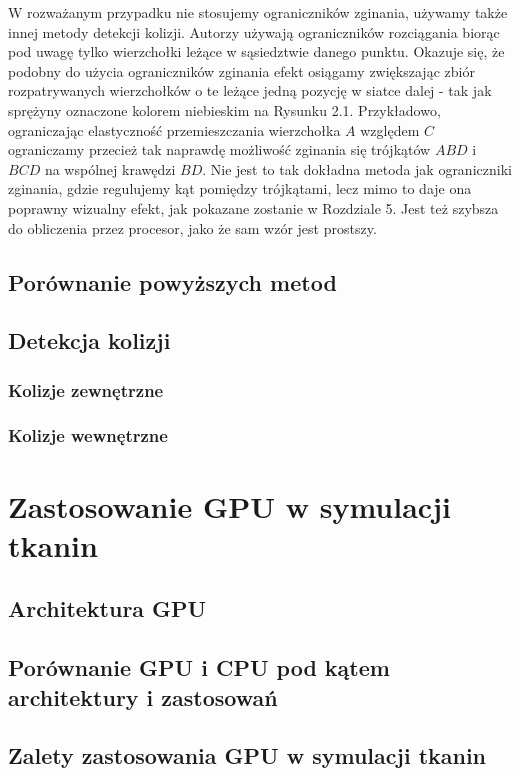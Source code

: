 			W rozważanym przypadku nie stosujemy ograniczników zginania, używamy także innej metody detekcji kolizji. Autorzy \cite{posbased} używają ograniczników rozciągania biorąc pod uwagę tylko wierzchołki leżące w sąsiedztwie danego punktu. Okazuje się, że podobny do użycia ograniczników zginania efekt osiągamy zwiększając zbiór rozpatrywanych wierzchołków o te leżące jedną pozycję w siatce dalej - tak jak sprężyny oznaczone kolorem niebieskim na Rysunku 2.1. Przykładowo, ograniczając elastyczność przemieszczania wierzchołka \(A\) względem \(C\) ograniczamy przecież tak naprawdę możliwość zginania się trójkątów \(ABD\) i \(BCD\) na wspólnej krawędzi \(BD\). Nie jest to tak dokładna metoda jak ograniczniki zginania, gdzie regulujemy kąt pomiędzy trójkątami, lecz mimo to daje ona poprawny wizualny efekt, jak pokazane zostanie w Rozdziale 5. Jest też szybsza do obliczenia przez procesor, jako że sam wzór jest prostszy.
		
		\subsection{Porównanie powyższych metod}
		\label{t:teoria:analiza:porownanie}
		
		\subsection{Detekcja kolizji}
		\label{t:teoria:analiza:kolizje}
		
			\subsubsection{Kolizje zewnętrzne}
			\label{t:teoria:analiza:kolizje:zewn}
			
			\subsubsection{Kolizje wewnętrzne}
			\label{t:teoria:analiza:kolizje:wewn}
			
			
	\section{Zastosowanie GPU w symulacji tkanin}
	\label{t:teoria:gpu}
	
		\subsection{Architektura GPU}
		\label{t:teoria:gpu:architektura}
		
		\subsection{Porównanie GPU i CPU pod kątem architektury i zastosowań}
		\label{t:teoria:gpu:porownanie}
		
		\subsection{Zalety zastosowania GPU w symulacji tkanin}
		\label{t:teoria:gpu:zalety}
